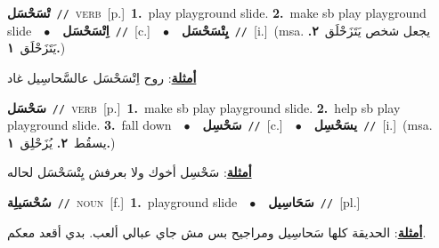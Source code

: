 \documentclass[10pt,a4paper,twoside]{article} %
\begin{document}
\begin{multicols}{2}
{\setlength\topsep{0pt}\textbf{\foreignlanguage{arabic}{تْسَحْسَل}}\ {\color{gray}\texttt{//}\color{black}}\ \textsc{verb}\ [p.]\ \textbf{1.}~play playground slide.  \textbf{2.}~make sb play playground slide\ \ $\bullet$\ \ \setlength\topsep{0pt}\textbf{\foreignlanguage{arabic}{اِتْسَحْسَل}}\ {\color{gray}\texttt{//}\color{black}}\ [c.]\ \ $\bullet$\ \ \setlength\topsep{0pt}\textbf{\foreignlanguage{arabic}{يِتْسَحْسَل}}\ {\color{gray}\texttt{//}\color{black}}\ [i.]\ \color{gray}(msa. \foreignlanguage{arabic}{يجعل شخص يَتَزَحْلَق}~\foreignlanguage{arabic}{\textbf{٢.}}  \foreignlanguage{arabic}{يَتَزَحْلَق}~\foreignlanguage{arabic}{\textbf{١.}})\color{black}\  \begin{flushright}\color{gray}\foreignlanguage{arabic}{\textbf{\underline{\foreignlanguage{arabic}{أمثلة}}}: روح اِتْسَحْسَل عالسَّحاسِيل غاد}\end{flushright}\color{black}} \vspace{2mm}

{\setlength\topsep{0pt}\textbf{\foreignlanguage{arabic}{سَحْسَل}}\ {\color{gray}\texttt{//}\color{black}}\ \textsc{verb}\ [p.]\ \textbf{1.}~make sb play playground slide.  \textbf{2.}~help sb play playground slide.  \textbf{3.}~fall down\ \ $\bullet$\ \ \setlength\topsep{0pt}\textbf{\foreignlanguage{arabic}{سَحْسِل}}\ {\color{gray}\texttt{//}\color{black}}\ [c.]\ \ $\bullet$\ \ \setlength\topsep{0pt}\textbf{\foreignlanguage{arabic}{يسَحْسِل}}\ {\color{gray}\texttt{//}\color{black}}\ [i.]\ \color{gray}(msa. \foreignlanguage{arabic}{يسقُط}~\foreignlanguage{arabic}{\textbf{٢.}}  \foreignlanguage{arabic}{يُزَحْلِق}~\foreignlanguage{arabic}{\textbf{١.}})\color{black}\  \begin{flushright}\color{gray}\foreignlanguage{arabic}{\textbf{\underline{\foreignlanguage{arabic}{أمثلة}}}: سَحْسِل أخوك ولا بعرفش يِتْسَحْسَل لحاله}\end{flushright}\color{black}} \vspace{2mm}

{\setlength\topsep{0pt}\textbf{\foreignlanguage{arabic}{سُحْسَيلِة}}\ {\color{gray}\texttt{//}\color{black}}\ \textsc{noun}\ [f.]\ \textbf{1.}~playground slide\ \ $\bullet$\ \ \setlength\topsep{0pt}\textbf{\foreignlanguage{arabic}{سَحَاسِيل}}\ {\color{gray}\texttt{//}\color{black}}\ [pl.]\  \begin{flushright}\color{gray}\foreignlanguage{arabic}{\textbf{\underline{\foreignlanguage{arabic}{أمثلة}}}: الحديقة كلها سَحاسِيل ومراجيح بس مش جاي عبالي ألعب. بدي أقعد معكم.}\end{flushright}\color{black}} \vspace{2mm}


\end{multicols}
\end{document}
